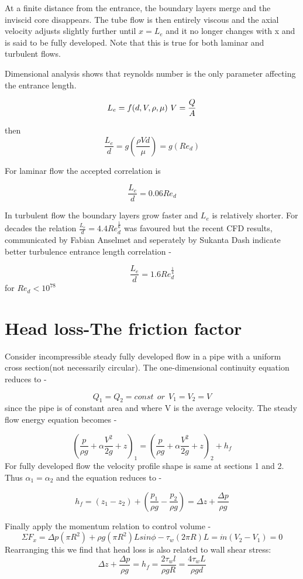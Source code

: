 \documentclass{report}
\begin{document}
At a finite distance from the entrance, the boundary layers merge and the inviscid core disappears. The tube flow is then entirely viscous and the
axial velocity adjusts slightly further until \(x=L_e\) and it no longer changes with x and is said to be fully developed. Note that this is true for
both laminar and turbulent flows.

Dimensional analysis shows that reynolds number is the only parameter affecting the entrance length.

\[L_e = f(d, V, \rho, \mu) \\\ V=\frac{Q}{A} \]

then
\[ \frac{L_e}{d} = g(\frac{\rho Vd}{\mu}) = g(Re_d)\]

For laminar flow the accepted correlation is 

\[ \frac{L_e}{d} = 0.06Re_d\]

In turbulent flow the boundary layers grow faster and \(L_e\) is relatively shorter. For decades the relation \(\frac{L_e}{d}=4.4 Re_d^{\frac{1}{6}}\) 
was favoured but the recent CFD results, communicated by Fabian Anselmet and seperately by Sukanta Dash indicate better turbulence entrance length correlation -

\[\frac{L_e}{d}=1.6 Re_d^{\frac{1}{4}}\] for \(Re_d < 10^78\)


\section{Head loss-The friction factor}
Consider incompressible steady fully developed flow in a pipe with a uniform cross section(not necessarily circular).
The one-dimensional continuity equation reduces to -

\[ Q_1=Q_2 = const \ \ or \ \ V_1=V_2=V\]
since the pipe is of constant area and where V is the average velocity. The steady flow energy equation becomes - 

\[ (\frac{p}{\rho g}+ \alpha \frac{V^2}{2g} +z)_1 = (\frac{p}{\rho g}+ \alpha \frac{V^2}{2g} +z)_2 + h_f\]
For fully developed flow the velocity profile shape is same at sections 1 and 2. Thus \(\alpha_1 =\alpha_2\) and the equation reduces to -

\[ h_f = (z_1-z_2) + (\frac{p_1}{\rho g} - \frac{p_2}{\rho g} ) = \Delta z + \frac{\Delta p}{\rho g}\]

Finally apply the momentum relation to control volume -
\[ \Sigma F_x = \Delta p (\pi R^2) + \rho g(\pi R^2)Lsin \phi - \tau_w(2\pi R)L = \dot{m}(V_2-V_1)=0\]
Rearranging this we find that head loss is also related to wall shear stress:
\[ \Delta z +\frac{\Delta p}{\rho g} = h_f = \frac{2 \tau_w l}{\rho g R} = \frac{4 \tau_w L}{\rho g d}\]
\end{document}
